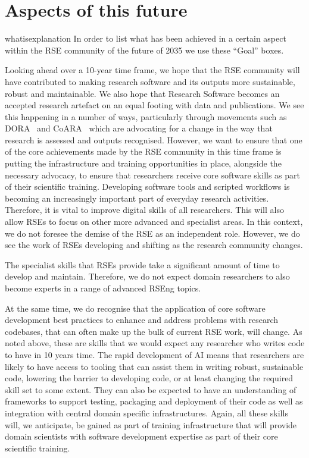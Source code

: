 \documentclass{eceasst}
\begin{document}
\section{Aspects of this future}
\begin{whatis}{}{whatisexplanation}
In order to list what has been achieved in a certain aspect within the RSE community of the future of 2035 we use these ``Goal'' boxes.
\end{whatis}

Looking ahead over a 10-year time frame, we hope that the RSE community will have
contributed to making research software and its outputs
more sustainable, robust and maintainable.
We also hope that Research Software becomes an accepted research artefact on an equal footing with data and publications.
We see this happening in a number of ways,
particularly through movements such as DORA~\cite{DORA} and CoARA~\cite{COARA} which are advocating for a change in the way that research is assessed and outputs recognised.
However, we want to ensure that one of the core achievements made by the RSE community in this time
frame is putting the infrastructure and training opportunities in place, alongside the necessary
advocacy, to ensure that researchers receive core software skills as part of their scientific training.
Developing software tools and scripted workflows is becoming an increasingly important part of everyday
research activities.
Therefore, it is vital to improve digital skills of all researchers.
This will also allow RSEs to focus on other more advanced and specialist areas.
In this context, we do not foresee the demise of the RSE as an independent role.
However, we do see the work of RSEs developing and shifting as the research community changes.

The specialist skills that RSEs provide take a significant amount of time to develop and maintain.
Therefore, we do not expect domain researchers to also become experts in a range of
advanced RSEng topics. 

At the same time, we do recognise that the application of core software development best practices
to enhance and address problems with research codebases, that can often make up the bulk of
current RSE work, will change. As noted above, these are skills that we
would expect any researcher who writes code to have in 10 years time. 
The rapid development of AI means that researchers are likely to have access to tooling that can assist
them in writing robust, sustainable code, lowering the barrier to developing code, or at least changing the
required skill set to some extent.
They can also be expected to have an understanding of frameworks to support testing, packaging and
deployment of their code as well as integration with central domain specific infrastructures.
Again, all these skills will, we anticipate, be gained as part of training infrastructure that will
provide domain scientists with software development expertise as part of their core scientific training.
\end{document}
